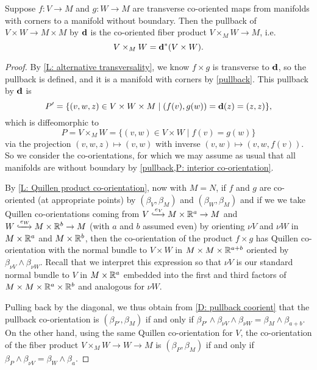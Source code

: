 \begin{proposition}\label{P: cross to cup}
	Suppose $f \colon V \to M$ and $g \colon W \to M$ are transverse co-oriented maps from manifolds with corners to a manifold without boundary.
	Then the pullback of $V \times W \to M \times M$ by $\mathbf{d}$ is the co-oriented fiber product $V \times_M W \to M$, i.e.\ $$V \times_M W = \mathbf{d}^*(V \times W).$$
\end{proposition}

\begin{proof}
	By \cref{L: alternative transversality}, we know $f \times g$ is transverse to $\mathbf{d}$, so the pullback is defined, and it is a manifold with corners by \cref{pullback}.
	This pullback by $\mathbf{d}$ is $$P' = \{(v,w,z) \in V \times W \times M \mid (f(v),g(w)) = \mathbf{d}(z) = (z,z)\},$$ which is diffeomorphic to $$P = V \times_M W = \{(v,w) \in V \times W \mid f(v) = g(w)\}$$ via the projection $(v,w,z) \mapsto (v,w)$ with inverse $(v,w) \mapsto (v,w,f(v))$.
	So we consider the co-orientations, for which we may assume as usual that all manifolds are without boundary by \cref{pullback,P: interior co-orientation}.

	By \cref{L: Quillen product co-orientation}, now with $M = N$, if $f$ and $g$ are co-oriented (at appropriate points) by $(\beta_V,\beta_M)$ and $(\beta_W,\beta_M)$ and if we we take Quillen co-orientations coming from $V \xhookrightarrow{e_V} M \times \mathbb{R}^a \to M$ and $W \xhookrightarrow{e_W} M \times \mathbb{R}^b \to M$ (with $a$ and $b$ assumed even) by orienting $\nu V$ and $\nu W$ in $M \times \mathbb{R}^a$ and $M \times \mathbb{R}^b$, then the co-orientation of the product $f \times g$ has Quillen co-orientation with the normal bundle to $V \times W$ in $M \times M \times \mathbb{R}^{a+b}$ oriented by $\beta_{\nu V} \wedge \beta_{\nu W}$.
	Recall that we interpret this expression so that $\nu V$ is our standard normal bundle to $V$ in $M \times \mathbb{R}^a$ embedded into the first and third factors of $M \times M \times \mathbb{R}^a \times \mathbb{R}^b$ and analogous for $\nu W$.

	Pulling back by the diagonal, we thus obtain from \cref{D: pullback coorient} that the pullback co-orientation is $(\beta_{P'},\beta_M)$ if and only if $\beta_{P'} \wedge \beta_{\nu V} \wedge \beta_{\nu W} = \beta_M \wedge \beta_{a+b}$.
	On the other hand, using the same Quillen co-orientation for $V$, the co-orientation of the fiber product $V \times_M W \to W \to M$ is $(\beta_P,\beta_M)$ if and only if $\beta_P \wedge \beta_{\nu V} = \beta_W \wedge \beta_a$.


\end{proof}
